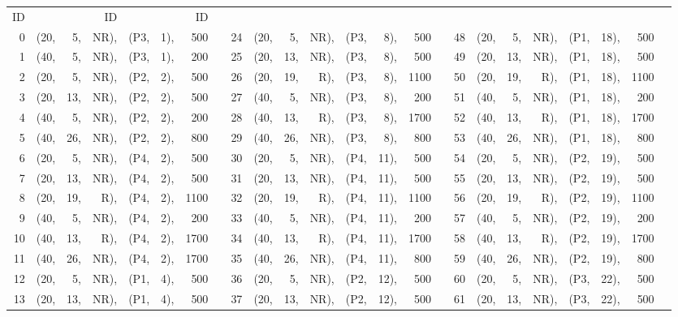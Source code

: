 \begin{table}[h!]
\begin{center}
\begin{scriptsize}
\begin{tabular}{*{3}{@{\hskip15pt}r|*{5}{r@{\hskip3pt}}rc}}
	ID&&&ID&&&ID&\\
													 													
   0&(20,& 5,&NR),&(P3,& 1),& 500&	& 	    24&(20,& 5,&NR),&(P3,& 8),& 500&  &     48&(20,& 5,&NR),&(P1,&18),& 500\\       
   1&(40,& 5,&NR),&(P3,& 1),& 200&  &       25&(20,&13,&NR),&(P3,& 8),& 500&  &     49&(20,&13,&NR),&(P1,&18),& 500\\  
   2&(20,& 5,&NR),&(P2,& 2),& 500&  &       26&(20,&19,& R),&(P3,& 8),&1100&  &     50&(20,&19,& R),&(P1,&18),&1100\\
   3&(20,&13,&NR),&(P2,& 2),& 500&  &       27&(40,& 5,&NR),&(P3,& 8),& 200&  &     51&(40,& 5,&NR),&(P1,&18),& 200\\
   4&(40,& 5,&NR),&(P2,& 2),& 200&  &       28&(40,&13,& R),&(P3,& 8),&1700&  &     52&(40,&13,& R),&(P1,&18),&1700\\
   5&(40,&26,&NR),&(P2,& 2),& 800&  &       29&(40,&26,&NR),&(P3,& 8),& 800&  &     53&(40,&26,&NR),&(P1,&18),& 800\\
   6&(20,& 5,&NR),&(P4,& 2),& 500&  &       30&(20,& 5,&NR),&(P4,&11),& 500&  &     54&(20,& 5,&NR),&(P2,&19),& 500\\
   7&(20,&13,&NR),&(P4,& 2),& 500&  &       31&(20,&13,&NR),&(P4,&11),& 500&  &     55&(20,&13,&NR),&(P2,&19),& 500\\
   8&(20,&19,& R),&(P4,& 2),&1100&  &       32&(20,&19,& R),&(P4,&11),&1100&  &     56&(20,&19,& R),&(P2,&19),&1100\\
   9&(40,& 5,&NR),&(P4,& 2),& 200&  &       33&(40,& 5,&NR),&(P4,&11),& 200&  &     57&(40,& 5,&NR),&(P2,&19),& 200\\
  10&(40,&13,& R),&(P4,& 2),&1700&  &       34&(40,&13,& R),&(P4,&11),&1700&  &     58&(40,&13,& R),&(P2,&19),&1700\\
  11&(40,&26,&NR),&(P4,& 2),&1700&  &       35&(40,&26,&NR),&(P4,&11),& 800&  &     59&(40,&26,&NR),&(P2,&19),& 800\\
  12&(20,& 5,&NR),&(P1,& 4),& 500&  &       36&(20,& 5,&NR),&(P2,&12),& 500&  &     60&(20,& 5,&NR),&(P3,&22),& 500\\
  13&(20,&13,&NR),&(P1,& 4),& 500&  &       37&(20,&13,&NR),&(P2,&12),& 500&  &     61&(20,&13,&NR),&(P3,&22),& 500\\

\end{tabular}
\end{scriptsize}
\end{center}
\end{table}
